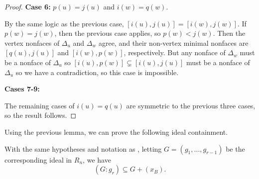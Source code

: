 \begin{proof}
    \medskip
    
    \noindent\textbf{Case 6:} $p(u)=j(u)$ and $i(w)=q(w)$. 
    
    \medskip
    
    By the same logic as the previous case, $[i(u),j(u)] = [i(w),j(w)]$.
    If $p(w)=j(w)$, then the previous case applies, so $p(w)<j(w)$.
    Then the vertex nonfaces of $\Delta_u$ and $\Delta_w$ agree, and their non-vertex minimal nonfaces are $[q(u),j(u)]$ and $[i(w),p(w)]$, respectively.
    But any nonface of $\Delta_w$ must be a nonface of $\Delta_u$ so $[i(u),p(w)] \subsetneq [i(u),j(u)]$ must be a nonface of $\Delta_u$ so we have a contradiction, so this case is impossible.

\medskip
 
 \noindent\textbf{Cases 7-9:}

\medskip

    The remaining cases of $i(u)=q(u)$ are symmetric to the previous three cases, so the result follows.
\end{proof}

Using the previous lemma, we can prove the following ideal containment.
\begin{lemma}\label{lem:colon-ideal-oscopy}
    With the same hypotheses and notation as , letting \newline $G = (g_1,\dots, g_{r-1})$ be the corresponding ideal in $R_n$, we have
    \begin{equation}\label{eq:colon-dagger}
    (G:g_r)\subseteq G+(x_B).
    \end{equation}
\end{lemma}

